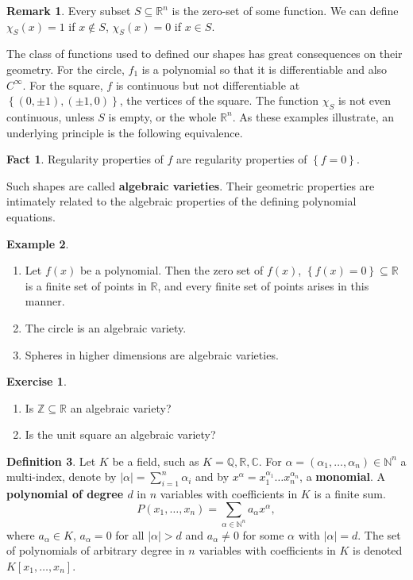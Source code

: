\documentclass{article}
\newcommand{\N}{\mathbb{N}}
\newcommand{\Z}{\mathbb{Z}}
\newcommand{\Q}{\mathbb{Q}}
\newcommand{\R}{\mathbb{R}}
\newcommand{\C}{\mathbb{C}}
\newcommand{\rb}[1]{\left( #1 \right)}
\renewcommand{\sb}[1]{\left[ #1 \right]}
\newcommand{\cb}[1]{\left\{ #1 \right\}}
\newcommand{\abs}[1]{\left\lvert #1 \right\rvert}
\theoremstyle{definition}\newtheorem{definition}{Definition}[section]
\theoremstyle{definition}\newtheorem{notation}[definition]{Notation}
\theoremstyle{definition}\newtheorem{remark}[definition]{Remark}
\theoremstyle{definition}\newtheorem{example}[definition]{Example}
\theoremstyle{definition}\newtheorem{fact}{Fact}
\theoremstyle{definition}\newtheorem{exercise}{Exercise}
\begin{document}
\begin{remark}
Every subset $ S \subseteq \R^n $ is the zero-set of some function. We can define $ \chi_S\rb{x} = 1 $ if $ x \notin S $, $ \chi_S\rb{x} = 0 $ if $ x \in S $.
\end{remark}

The class of functions used to defined our shapes has great consequences on their geometry. For the circle, $ f_1 $ is a polynomial so that it is differentiable and also $ C^\infty $. For the square, $ f $ is continuous but not differentiable at $ \cb{\rb{0, \pm 1}, \rb{\pm 1, 0}} $, the vertices of the square. The function $ \chi_S $ is not even continuous, unless $ S $ is empty, or the whole $ \R^n $. As these examples illustrate, an underlying principle is the following equivalence.

\begin{fact}
Regularity properties of $ f $ are regularity properties of $ \cb{f = 0} $.
\end{fact}

Such shapes are called \textbf{algebraic varieties}. Their geometric properties are intimately related to the algebraic properties of the defining polynomial equations.

\begin{example}
\hfill
\begin{enumerate}
\item Let $ f\rb{x} $ be a polynomial. Then the zero set of $ f\rb{x} $, $ \cb{f\rb{x} = 0} \subseteq \R $ is a finite set of points in $ \R $, and every finite set of points arises in this manner.
\item The circle is an algebraic variety.
\item Spheres in higher dimensions are algebraic varieties.
\end{enumerate}
\end{example}

\begin{exercise}
\hfill
\begin{enumerate}
\item Is $ \Z \subseteq \R $ an algebraic variety?
\item Is the unit square an algebraic variety?
\end{enumerate}
\end{exercise}

\begin{definition}
Let $ K $ be a field, such as $ K = \Q, \R, \C $. For $ \alpha = \rb{\alpha_1, \dots, \alpha_n} \in \N^n $ a multi-index, denote by $ \abs{\alpha} = \sum_{i = 1}^n \alpha_i $ and by $ x^\alpha = x_1^{\alpha_1} \dots x_n^{\alpha_n} $, a \textbf{monomial}. A \textbf{polynomial of degree $ d $} in $ n $ variables with coefficients in $ K $ is a finite sum.
$$ P\rb{x_1, \dots, x_n} = \sum_{\alpha \in \N^n} a_\alpha x^\alpha, $$
where $ a_\alpha \in K $, $ a_\alpha = 0 $ for all $ \abs{\alpha} > d $ and $ a_\alpha \ne 0 $ for some $ \alpha $ with $ \abs{\alpha} = d $. The set of polynomials of arbitrary degree in $ n $ variables with coefficients in $ K $ is denoted $ K\sb{x_1, \dots, x_n} $.
\end{definition}
\end{document}
